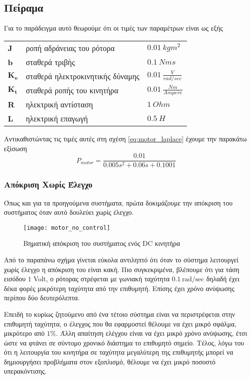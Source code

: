 \subsection{Πείραμα}

Για το παράδειγμα αυτό θεωρούμε ότι οι τιμές των παραμέτρων είναι ως εξής
\begin{flushleft}
\begin{tabular}{lll}
\textbf{J} & ροπή αδράνειας του ρότορα & $0.01\ kgm^2$ \\ 
\textbf{b} & σταθερά τριβής & $0.1\ Nms$ \\  
$\mathbf{K_e}$ & σταθερά ηλεκτροκινητικής δύναμης & $0.01\ \frac{V}{rad/sec}$ \\  
$\mathbf{K_t}$ & σταθερά ροπής του κινητήρα & $0.01\ \frac{Nm}{Ampere}$ \\  
\textbf{R} & ηλεκτρική αντίσταση & $1\ Ohm$ \\ 
\textbf{L} & ηλεκτρική επαγωγή & $0.5\ H$ \\ 
\end{tabular} 
\end{flushleft}

Αντικαθιστώντας τις τιμές αυτές στη σχέση \ref{eq:motor_laplace} έχουμε την παρακάτω εξίσωση
\begin{equation}
P_{motor} = \frac{0.01}{0.005s^2+0.06s+0.1001}
\end{equation}

\subsubsection{Απόκριση Χωρίς Έλεγχο}

Όπως και για τα προηγούμενα συστήματα, πρώτα δοκιμάζουμε την απόκριση του συστήματος όταν αυτό δουλεύει χωρίς έλεγχο.
\begin{figure}[h]
  \centering
  \texttt{[image: motor\_no\_control]}
  \caption{Βηματική απόκριση του συστήματος ενός DC κινητήρα}
  \label{fig:motor_no_control}
\end{figure}
Από το παραπάνω σχήμα γίνεται εύκολα αντιληπτό ότι όταν το σύστημα λειτουργεί χωρίς έλεγχο η απόκριση του είναι κακή. Πιο συγκεκριμένα, βλέπουμε ότι για τάση εισόδου $1$ Volt, ο ρότορας στρέφεται με γωνιακή ταχύτητα $0.1\ \text{rad/sec}$ δηλαδή έχει δέκα φορές μικρότερη ταχύτητα από την επιθυμητή. Επίσης έχει χρόνο ανύψωσης περίπου δύο δευτερόλεπτα.

Επειδή το κυρίως ζητούμενο από ένα τέτοιο σύστημα είναι να περιστρέφεται στην επιθυμητή ταχύτητα, ο έλεγχος που θα εφαρμοστεί θέλουμε να έχει μικρό σφάλμα, μικρότερο από $1\%$. Άλλη απαίτηση ελέγχου είναι να έχει μικρό χρόνο ανύψωσης, έτσι ώστε να φτάνει σε σύντομο χρονικό διάστημα το επιθυμητό σημείο. Τέλος, λόγω του ότι η λειτουργία του κινητήρα σε ταχύτητα μεγαλύτερη της επιθυμητής μπορεί να δημιουργήσει προβλήματα στον εξοπλισμό, θέλουμε να έχει μικρό ποσοστό υπερακόντισης.

